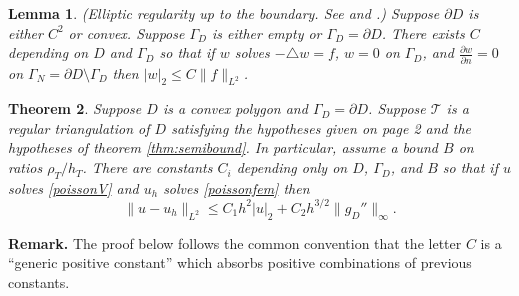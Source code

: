 \documentclass[12pt]{amsart}
\newtheorem{thm}{Theorem}
\newtheorem{lem}[thm]{Lemma}
\theoremstyle{definition}
\newcommand{\calT}{\mathcal{T}}
\newcommand{\ddn}[1]{\frac{\partial #1}{\partial n}}
\newcommand{\lap}{\triangle}
\begin{document}
\begin{lem}\label{lem:ellipticreg}  (\emph{Elliptic regularity up to the boundary.  See \cite[section 6.3.2]{Evans} and \cite{Grisvard}.})  Suppose $\partial D$ is either $C^2$ or convex.  Suppose $\Gamma_D$ is either empty or $\Gamma_D=\partial D$.  There exists $C$ depending on $D$ and $\Gamma_D$ so that if $w$ solves $-\lap w = f$, $w=0$ on $\Gamma_D$, and $\ddn{w}=0$ on $\Gamma_N=\partial D\setminus \Gamma_D$ then $|w|_2 \le C \|f\|_{L^2}$.
\end{lem}

\begin{thm}\label{thm:nonhomoD}  Suppose $D$ is a convex polygon and $\Gamma_D=\partial D$.  Suppose $\calT$ is a regular triangulation of $D$ satisfying the hypotheses given on page 2 and the hypotheses of theorem \ref{thm:semibound}.  In particular, assume a bound $B$ on ratios $\rho_T/h_T$.  There are constants $C_i$ depending only on $D$, $\Gamma_D$, and $B$ so that if $u$ solves \eqref{poissonV} and $u_h$ solves \eqref{poissonfem} then
    $$\|u-u_h\|_{L^2} \le C_1 h^2 |u|_2 + C_2 h^{3/2} \|g_D''\|_\infty.$$
\end{thm}

\smallskip\noindent \textbf{Remark.}  The proof below follows the common convention that the letter $C$ is a ``generic positive constant'' which absorbs positive combinations of previous constants.
\end{document}
